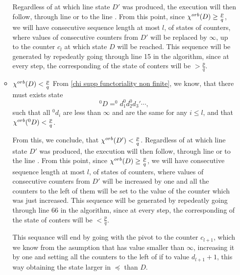 \begin{itemize}
\begin{itemize}
Regardless of at which line state $D'$ was produced, the execution will then follow, 
through line  or to the line    . From this point, since ${\chi^{orb}(D)} \geq \frac{p}{q}$, we will 
have consecutive sequence length at most $l$, of states of counters, where 
values of consecutive counters 
from $D'$ will be 
replaced by $\infty$, up to the counter $c_l$ at which state $D$ will be reached. 
This sequence will be generated by repedeatly going through line 15 in the algorithm, since 
at every step, the corresponding \Eoc of the state of conters will be $> \frac{p}{q}$.

\item ${\chi^{orb}(D)} < \frac{p}{q}$
From \ref{chi supp functoriality non finite}, we know, that there must exists state 
\begin{equation}^0D = ^0d_1^0d_2^0d_3'\cdots,
\end{equation} 
such that 
all $^0d_i$ are less than $\infty$ and are the same for 
any $i \leq l$, and that ${\chi^{orb}(^0D)} < \frac{p}{q}$. 

From this, we conclude, that ${\chi^{orb}(D')} < \frac{p}{q}$. 
Regardless of at which line state $D'$ was produced, the execution will then follow, 
through line  or to the line    . From this point, since ${\chi^{orb}(D)} \geq \frac{p}{q}$, we will 
have consecutive sequence length at most $l$, of states of counters, where 
values of consecutive counters 
from $D'$ will be increased by one and all the counters to the left of them will be set to 
the value of the counter which was just increased. 
This sequence will be generated by repedeatly going through line 66 in the algorithm, since 
at every step, the corresponding \Eoc of the state of conters will be $< \frac{p}{q}$.

This sequance will end by going with the pivot to the counter $c_{l+1}$, which we 
know from the asumption that has value smaller than $\infty$, increasing it by one 
and setting all the counters to the left of if to value $d_{l+1}+1$, this way obtaining 
the state larger in $\preceq$ than $D$. 
\end{itemize}


\end{itemize}
